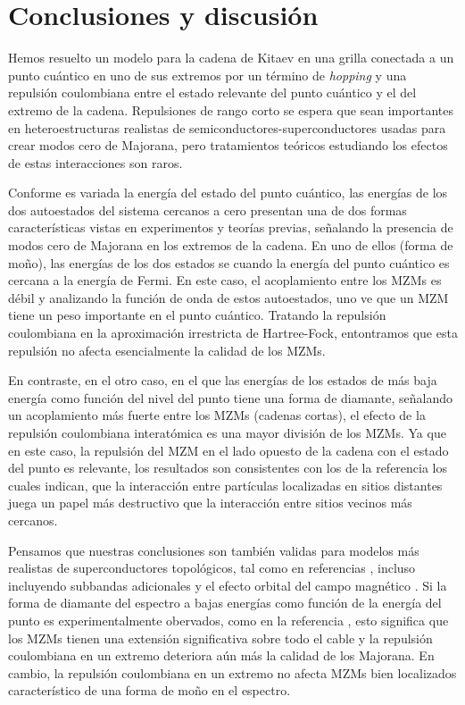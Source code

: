 \chapter{Conclusiones y discusi\'{o}n}
Hemos resuelto un modelo para la cadena de Kitaev en una grilla conectada a un punto cu\'{a}ntico en uno de sus extremos por un t\'{e}rmino de \emph{hopping} y una repulsi\'{o}n coulombiana entre el estado relevante del punto cu\'{a}ntico y el del extremo de la cadena. Repulsiones de rango corto se espera que sean importantes en heteroestructuras realistas de semiconductores-superconductores usadas para crear modos cero de Majorana, pero tratamientos te\'{o}ricos estudiando los efectos de estas interacciones son raros. 

Conforme es variada la energ\'{i}a del estado del punto cu\'{a}ntico, las energ\'{i}as de los dos autoestados del sistema cercanos a cero presentan una de dos formas caracter\'{i}sticas vistas en experimentos y teor\'{i}as previas, se\~{n}alando la presencia de modos cero de Majorana en los extremos de la cadena. En uno de ellos (forma de mo\~{n}o), las energ\'{i}as de los dos estados se cuando la energ\'{i}a del punto cu\'{a}ntico es cercana a la energ\'{i}a de Fermi. En este caso, el acoplamiento entre los MZMs es d\'{e}bil y analizando la funci\'{o}n de onda de estos autoestados, uno ve que un MZM tiene un peso importante en el punto cu\'{a}ntico. Tratando la repulsi\'{o}n coulombiana en la aproximaci\'{o}n irrestricta de Hartree-Fock, entontramos que esta repulsi\'{o}n no afecta esencialmente la calidad de los MZMs.

En contraste, en el otro caso, en el que las energ\'{i}as de los estados de m\'{a}s baja energ\'{i}a como funci\'{o}n del nivel del punto tiene una forma de diamante, se\~{n}alando un acoplamiento m\'{a}s fuerte entre los MZMs (cadenas cortas), el efecto de la repulsi\'{o}n coulombiana interat\'{o}mica es una mayor divisi\'{o}n de los MZMs. Ya que en este caso, la repulsi\'{o}n del MZM en el lado opuesto de la cadena con el estado del punto es relevante, los resultados son consistentes con los de la referencia \cite{PhysRevB.100.144510} los cuales indican, que la interacci\'{o}n entre part\'{i}culas localizadas en sitios distantes juega un papel m\'{a}s destructivo que la interacci\'{o}n entre sitios vecinos m\'{a}s cercanos. 

Pensamos que nuestras conclusiones son tambi\'{e}n validas para modelos m\'{a}s realistas de superconductores topol\'{o}gicos, tal como en referencias \cite{Lutchyn2010MajoranaFA,PhysRevLett.105.177002}, incluso incluyendo subbandas adicionales y el efecto orbital del campo magn\'{e}tico \cite{PhysRevB.107.245423}. Si la forma de diamante del espectro a bajas energ\'{i}as como funci\'{o}n de la energ\'{i}a del punto es experimentalmente obervados, como en la referencia \cite{PhysRevB.98.085125}, esto significa que los MZMs tienen una extensi\'{o}n significativa sobre todo el cable y la repulsi\'{o}n coulombiana en un extremo deteriora a\'{u}n m\'{a}s la calidad de los Majorana. En cambio, la repulsi\'{o}n coulombiana en un extremo no afecta MZMs bien localizados caracter\'{i}stico de una forma de mo\~{n}o en el espectro. 